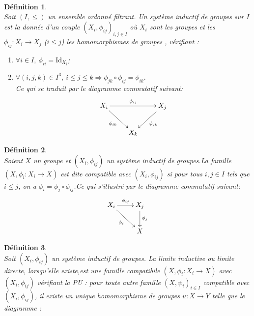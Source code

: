 \documentclass[a4paper, 14pt]{report}
\newtheorem{definition}{Définition}[section]
\begin{document}
\begin{onehalfspace}
{			
			\begin{definition} \cite{ribes-zalesskii} \\
				Soit $(I, \leq)$ un ensemble ordonné filtrant. Un système inductif de groupes sur $I$ est la donnée d'un couple $(X_{i},\phi_{ij})_{i,j \in I}$ où $X_{i}$ sont les groupes et les $\phi_{ij} : X_{i} \to X_{j}$ ($i \leq j$) les homomorphismes de groupes  , vérifiant :
				\begin{enumerate} [label=\roman*)]
					\item $ \forall i \in I, \ \phi_{ii} = \mathrm{Id}_{X_{i}} $;
					\item $\forall (i, j, k) \in I^{3}, \ i \leq j \leq k \Rightarrow \phi_{jk} \circ \phi_{ij} = \phi_{ik} .$\\
					Ce qui se traduit par le diagramme commutatif suivant:
					\[
					\xymatrix{
						X_{i} \ar[rr]^{\phi_{ij}} \ar[dr]_{\phi_{ik}} & & X_{j} \ar[dl]^{\phi_{jk}} \\
						& X_{k} &
					}
					\]
					
				\end{enumerate}
			\end{definition}
			
			
			\begin{definition} \cite{ribes-zalesskii} \\
				Soient $X$ un groupe et $(X_i, \phi_{ij})$ un système inductif de groupes.La famille $(X,\phi_i :X_i \rightarrow X)$ est dite compatible avec $(X_i, \phi_{ij})$ si pour tous $i,j \in I$ tels que $i \leq j$, on a $\phi_i = \phi_j \circ \phi_{ij}$.Ce qui s'illustré par le diagramme commutatif suivant:
				\[
				\xymatrix{
					X_{i} \ar[r]^{\phi_{ij}} \ar[dr]_{\phi_i} & X_{j} \ar[d]^{\phi_j} \\
					& X
				}
				\]
				
			\end{definition}
			
			\begin{definition} \cite{ribes-zalesskii} \\
				Soit $(X_i, \phi_{ij})$ un système inductif de groupes.
				La limite inductive ou limite directe, lorsqu'elle existe,est une famille compatibile $(X,\phi_i :X_i \rightarrow X)$ avec $(X_i, \phi_{ij})$ vérifiant la PU : pour toute autre famille  $(X,\psi_i)_{i \in I}$ compatible avec $(X_i, \phi_{ij})$, il existe un unique homomorphisme de groupes $u : X \to Y$ telle que le diagramme :
				
				\begin{tikzpicture}[auto]
					

\end{tikzpicture}
\end{definition}}
\end{onehalfspace}
\end{document}
